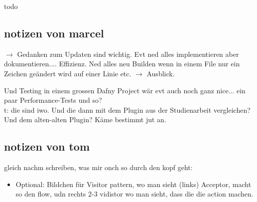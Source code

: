 todo


\subsection{notizen von marcel}

$\rightarrow$ Gedanken zum Updaten sind wichtig. Evt ned alles implementieren aber dokumentieren.... Effizienz. Ned alles neu Builden
wenn in einem File nur ein Zeichen geändert wird auf einer Linie etc. $\rightarrow$ Ausblick.

Und Testing in einem grossen Dafny Project wär evt auch noch ganz nice... ein paar Performance-Tests und so?  \\t: die sind iwo.
Und die dann mit dem Plugin aus der Studienarbeit vergleichen? Und dem alten-alten Plugin? Käme bestimmt jut an.


\subsection{notizen von tom}
gleich nachm schreiben, was mir onch so durch den kopf geht:
\begin{itemize}
    \item Optional: Bildchen für Visitor pattern, wo man sieht (links) Acceptor, macht so den flow, udn rechts 2-3 vidistor wo man sieht, dass die die action machen.
\end{itemize}
